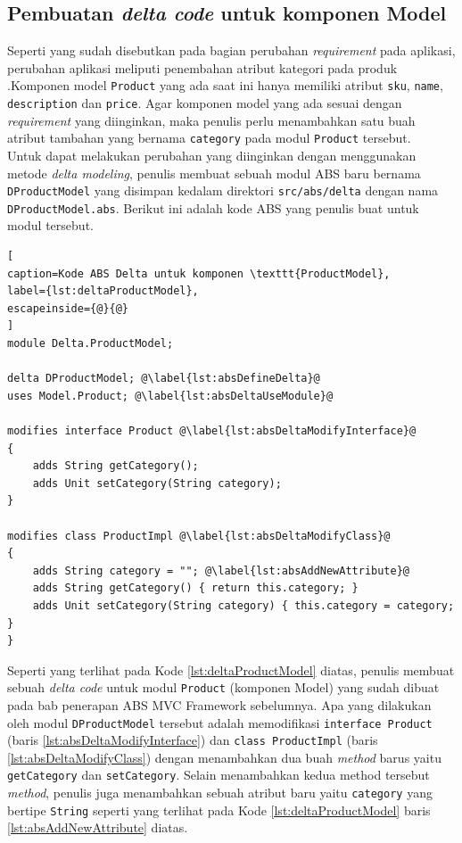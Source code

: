 \subsection{Pembuatan \textit{delta code} untuk komponen Model}

Seperti yang sudah disebutkan pada bagian perubahan \textit{requirement} pada aplikasi, perubahan aplikasi meliputi penembahan atribut kategori pada produk .Komponen model \texttt{Product} yang ada saat ini hanya memiliki atribut \texttt{sku}, \texttt{name}, \texttt{description} dan \texttt{price}. Agar komponen model yang ada sesuai dengan \textit{requirement} yang diinginkan, maka penulis perlu menambahkan satu buah atribut tambahan yang bernama \texttt{category} pada modul \texttt{Product} tersebut.\\

Untuk dapat melakukan perubahan yang diinginkan dengan menggunakan metode \textit{delta modeling}, penulis membuat sebuah modul ABS baru bernama \texttt{DProductModel} yang disimpan kedalam direktori \texttt{src/abs/delta} dengan nama \texttt{DProductModel.abs}. Berikut ini adalah kode ABS yang penulis buat untuk modul tersebut.

\begin{lstlisting}[
caption=Kode ABS Delta untuk komponen \texttt{ProductModel},
label={lst:deltaProductModel},
escapeinside={@}{@}
]
module Delta.ProductModel;

delta DProductModel; @\label{lst:absDefineDelta}@
uses Model.Product; @\label{lst:absDeltaUseModule}@

modifies interface Product @\label{lst:absDeltaModifyInterface}@
{
	adds String getCategory();
	adds Unit setCategory(String category);
}

modifies class ProductImpl @\label{lst:absDeltaModifyClass}@
{
	adds String category = ""; @\label{lst:absAddNewAttribute}@
	adds String getCategory() { return this.category; }
	adds Unit setCategory(String category) { this.category = category; }
}
\end{lstlisting}

Seperti yang terlihat pada Kode \ref{lst:deltaProductModel} diatas, penulis membuat sebuah \textit{delta code} untuk modul \texttt{Product} (komponen Model) yang sudah dibuat pada bab penerapan ABS MVC Framework sebelumnya. Apa yang dilakukan oleh modul \texttt{DProductModel} tersebut adalah memodifikasi \texttt{interface Product} (baris \ref{lst:absDeltaModifyInterface}) dan \texttt{class ProductImpl} (baris \ref{lst:absDeltaModifyClass}) dengan menambahkan dua buah \textit{method} barus yaitu \texttt{getCategory} dan \texttt{setCategory}. Selain menambahkan kedua method tersebut \textit{method}, penulis juga menambahkan sebuah atribut baru yaitu \texttt{category} yang bertipe \texttt{String} seperti yang terlihat pada Kode \ref{lst:deltaProductModel} baris \ref{lst:absAddNewAttribute} diatas.\\

